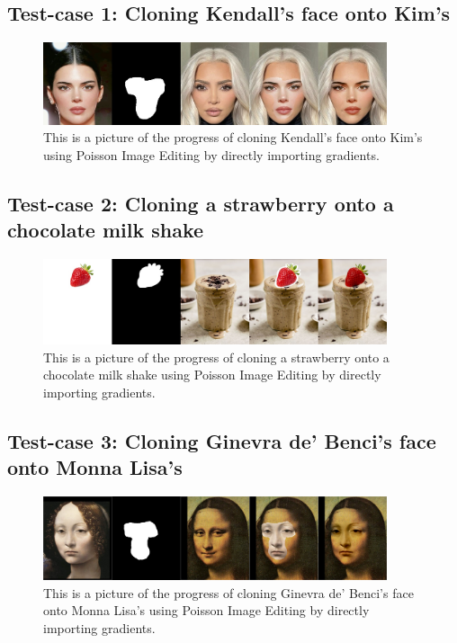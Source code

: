 \documentclass[10pt, a4paper]{article}%
\begin{document}
 \subsection{Test-case 1: Cloning Kendall's face onto Kim's }
 \begin{figure}[h]
     \centering
     \includegraphics[width=0.9\textwidth]{progress_import_Kardashian.jpg}
     \caption{This is a picture of the progress of cloning Kendall's face onto Kim's using Poisson Image Editing by directly importing gradients.}
     \label{fig:my_label}
 \end{figure}
 \subsection{Test-case 2: Cloning a strawberry onto a chocolate milk shake }
 \begin{figure}[H]
     \centering
     \includegraphics[width=0.9\textwidth]{progress_import_strawberry Milk Shake.jpg}
     \caption{This is a picture of the progress of cloning a strawberry onto a chocolate milk shake using Poisson Image Editing by directly importing gradients.}
     \label{fig:my_label}
 \end{figure}
 \subsection{Test-case 3: Cloning Ginevra de' Benci's face onto Monna Lisa’s}
 \begin{figure}[H]
     \centering
     \includegraphics[width=0.9\textwidth]{progress_import_monna.png}
     \caption{This is a picture of the progress of cloning Ginevra de' Benci's face onto Monna Lisa's using Poisson Image Editing by directly importing gradients.}
     \label{fig:my_label}
 \end{figure}
\end{document}

